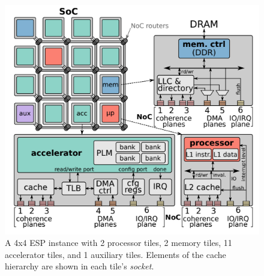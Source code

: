 
\begin{figure}[t]
  \centering
  \captionsetup{justification=centering, format=hang}
  \includegraphics[width=1\columnwidth]{fig/noccache.png}
  \caption{A 4x4 ESP instance with 2 processor tiles, 2 memory tiles, 11 accelerator tiles, and 1 auxiliary tiles. Elements of the cache hierarchy are shown in each tile's \textit{socket}.}
  \label{fig:esp_tile}
  \end{figure}

